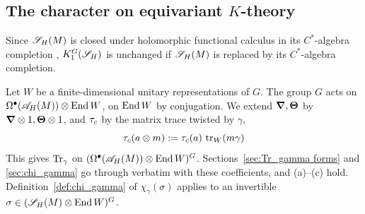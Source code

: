 \documentclass[11pt]{amsart}
\theoremstyle{plain}
\theoremstyle{definition}
\theoremstyle{remark}
\begin{document}
\subsection{The character on equivariant $K$-theory}\label{sec:chi_gamma well defined}


Since ${\mathscr{S}_H}(M)$ is closed under holomorphic functional calculus in its $C^*$-algebra completion \cite[Appendix]{GvE20},
$K_1^G({\mathscr{S}_H})$ is  unchanged if ${\mathscr{S}_H}(M)$ is replaced by its $C^*$-algebra completion.

Let $W$ be a finite-dimensional unitary representations of $G$.
The group $G$ acts on $\Omega^\bullet({\mathscr{A}}_H(M))\otimes\operatorname{End} W$, on $\operatorname{End} W$ by conjugation.
We extend $\boldsymbol{\nabla}, \boldsymbol{\Theta}$ by $\boldsymbol{\nabla}\otimes1, \boldsymbol{\Theta}\otimes1$, and $\tau_{c}$ by the matrix trace twisted by $\gamma$, 
\[\tau_{c}(a\otimes m):=\tau_{c}(a)\,\operatorname{tr}_W(m\gamma)\]
This gives $\operatorname{Tr}_\gamma$ on $(\Omega^\bullet({\mathscr{A}}_H(M))\otimes\operatorname{End} W)^G$.
Sections~\ref{sec:Tr_gamma forms} and \ref{sec:chi_gamma} go through verbatim with these coefficients, and  (a)--(c) hold. 
Definition~\ref{def:chi_gamma} of $\chi_\gamma(\sigma)$ applies to an invertible $\sigma\in({\mathscr{S}_H}(M)\otimes\operatorname{End} W)^G$.


\end{document}
